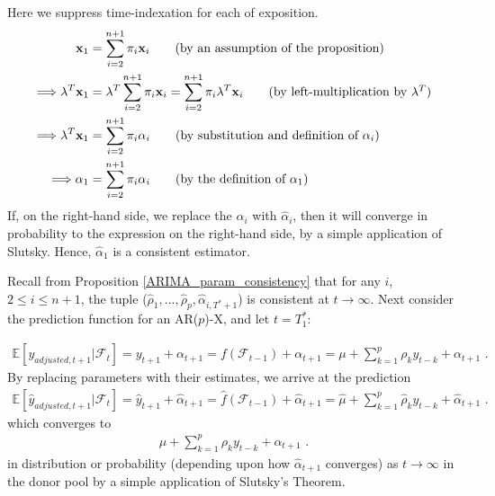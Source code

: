 \documentclass{uiucthesis2021}
\newcommand{\weight}{\pi}
\newcommand{\x}{\textbf{x}}
\def\E{\mathbb{E}} %
\theoremstyle{definition}
\newenvironment{proof-of-proposition}[1][{}]{\noindent{\bf
    Proof of Proposition {#1}}
  \hspace*{.5em}}{\qed\bigskip\\}
\begin{document}
  \begin{proof-of-proposition}[\ref{ARIMA_aggregated_alpha}]
    Here we suppress time-indexation for each of exposition.
    \begin{align}
      \x_{1} &= \sum^{n+1}_{i=2}\weight_{i}\x_{i} \tag{by an assumption of the proposition}\\
     \Longrightarrow \lambda^{T}\x_{1} &= \lambda^{T}\sum^{n+1}_{i=2}\weight_{i}\x_{i}  = \sum^{n+1}_{i=2}\weight_{i}\lambda^{T}\x_{i}\tag{by left-multiplication by $\lambda^{T}$}\\
      \Longrightarrow\lambda^{T}\x_{1} &=\sum^{n+1}_{i=2}\pi_{i}\alpha_{i}\tag{by substitution and definition of $\alpha_{i}$}\\
      \Longrightarrow\alpha_{1} &=\sum^{n+1}_{i=2}\pi_{i}\alpha_{i} \tag{by the definition of $\alpha_{1}$}
      \end{align} 
      If, on the right-hand side, we replace the $\alpha_{i}$ with $\hat\alpha_{i}$, then it will converge in probability to the expression on the right-hand side, by a simple application of Slutsky.  Hence, $\hat\alpha_{1}$ is a consistent estimator.
  \end{proof-of-proposition}

  \begin{proof-of-proposition}[\ref{ARIMA_conv_distribution}]

    Recall from Proposition \ref{ARIMA_param_consistency} that for any $i$, $2\leq i \leq n+1$, the tuple 
    ($\hat\rho_{1},...,\hat\rho_{p}, \hat\alpha_{i,T^{*}+1}$) is consistent at $t\rightarrow \infty$.  Next consider the prediction function for an AR($p$)-X, and let $t = T_{1}^{*}$:

    \begin{align*}
    \E[y_{adjusted,t+1}|\mathcal{F}_{t}] = y_{t+1} + \alpha_{t+1} = f(\mathcal{F}_{t-1}) + \alpha_{t+1} = \mu + \sum^{p}_{k=1}\rho_{k}y_{t-k} + \alpha_{t+1} \text{ .}
    \end{align*}
    By replacing parameters with their estimates, we arrive at the prediction 
    \begin{align*}
      \E[\hat{y}_{adjusted,t+1}|\mathcal{F}_{t}] = \hat{y}_{t+1} + \hat\alpha_{t+1} = \hat{f}(\mathcal{F}_{t-1}) + \hat\alpha_{t+1} = \hat\mu + \sum^{p}_{k=1}\hat\rho_{k}y_{t-k} + \hat{\alpha}_{t+1} \text{ .}
      \end{align*}
    which converges to 
    \begin{align*}
       \mu + \sum^{p}_{k=1}\rho_{k}y_{t-k} + \alpha_{t+1} \text{ .}
      \end{align*}
    in distribution or probability (depending upon how $\hat\alpha_{t+1}$ converges) as $t\rightarrow\infty$ in the donor pool by a simple application of Slutsky's Theorem.
    
    \end{proof-of-proposition}
\end{document}
